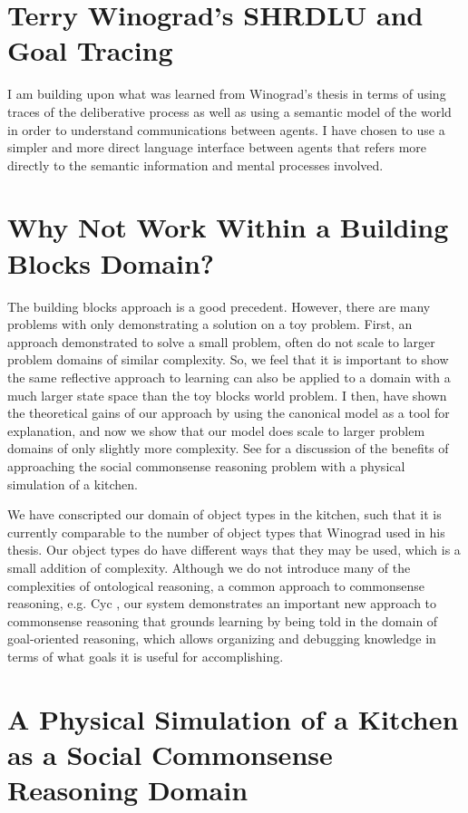 \section{Terry Winograd's SHRDLU and Goal Tracing}

I am building upon what was learned from Winograd's thesis
\citep{winograd:1970} in terms of using traces of the deliberative
process as well as using a semantic model of the world in order to
understand communications between agents.  I have chosen to use a
simpler and more direct language interface between agents that refers
more directly to the semantic information and mental processes
involved.

\section{Why Not Work Within a Building Blocks Domain?}

The building blocks approach is a good precedent.  However, there are
many problems with only demonstrating a solution on a toy problem.
First, an approach demonstrated to solve a small problem, often do not
scale to larger problem domains of similar complexity.  So, we feel
that it is important to show the same reflective approach to learning
can also be applied to a domain with a much larger state space than
the toy blocks world problem.  I then, have shown the theoretical
gains of our approach by using the canonical model as a tool for
explanation, and now we show that our model does scale to larger
problem domains of only slightly more complexity.  See
\cite{smith:2010} for a discussion of the benefits of approaching the
social commonsense reasoning problem with a physical simulation of a
kitchen.

We have conscripted our domain of object types in the kitchen, such
that it is currently comparable to the number of object types that
Winograd used in his thesis.  Our object types do have different ways
that they may be used, which is a small addition of complexity.
Although we do not introduce many of the complexities of ontological
reasoning, a common approach to commonsense reasoning, e.g. Cyc
\citep{lenat:1990}, our system demonstrates an important new approach
to commonsense reasoning that grounds learning by being told in the
domain of goal-oriented reasoning, which allows organizing and
debugging knowledge in terms of what goals it is useful for
accomplishing.

\section{A Physical Simulation of a Kitchen as a Social Commonsense Reasoning Domain}

